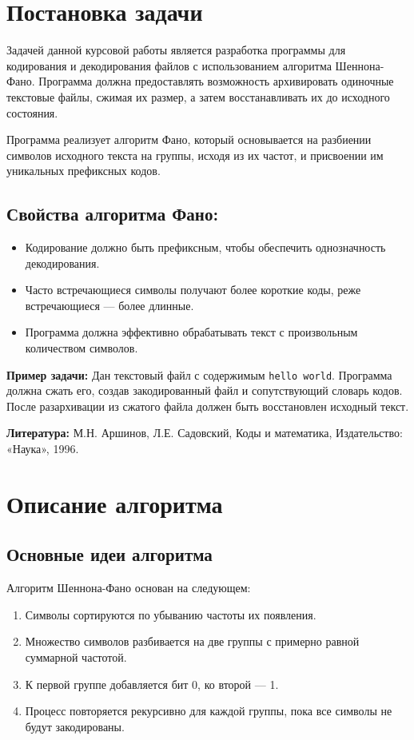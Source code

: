 \documentclass[a4paper,14pt]{article}
\begin{document}
\tableofcontents
\newpage

\section{Постановка задачи}
Задачей данной курсовой работы является разработка программы для кодирования и декодирования файлов с использованием алгоритма Шеннона-Фано. Программа должна предоставлять возможность архивировать одиночные текстовые файлы, сжимая их размер, а затем восстанавливать их до исходного состояния.

Программа реализует алгоритм Фано, который основывается на разбиении символов исходного текста на группы, исходя из их частот, и присвоении им уникальных префиксных кодов.

\subsection*{Свойства алгоритма Фано:}
\begin{itemize}
    \item Кодирование должно быть префиксным, чтобы обеспечить однозначность декодирования.
    \item Часто встречающиеся символы получают более короткие коды, реже встречающиеся — более длинные.
    \item Программа должна эффективно обрабатывать текст с произвольным количеством символов.
\end{itemize}

\textbf{Пример задачи:} Дан текстовый файл с содержимым \texttt{hello world}. Программа должна сжать его, создав закодированный файл и сопутствующий словарь кодов. После разархивации из сжатого файла должен быть восстановлен исходный текст.

\textbf{Литература:} М.Н. Аршинов, Л.Е. Садовский, Коды и математика, Издательство: «Наука», 1996.

\newpage
\section{Описание алгоритма}
\subsection{Основные идеи алгоритма}
Алгоритм Шеннона-Фано основан на следующем:
\begin{enumerate}
    \item Символы сортируются по убыванию частоты их появления.
    \item Множество символов разбивается на две группы с примерно равной суммарной частотой.
    \item К первой группе добавляется бит 0, ко второй — 1.
    \item Процесс повторяется рекурсивно для каждой группы, пока все символы не будут закодированы.
\end{enumerate}
\end{document}
